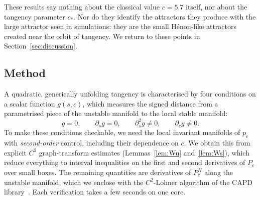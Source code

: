\documentclass[11pt]{amsart}
\theoremstyle{definition}
\theoremstyle{remark}
\newcommand{\cs}{c_*}
\begin{document}
These results say nothing about the classical value $c=5.7$ itself, nor about the tangency parameter $\cs$.
Nor do they identify the attractors they
produce with the large attractor seen in simulations: they are the small H\'enon-like attractors created
near the orbit of tangency. We return to these points in Section~\ref{sec:discussion}.

\subsection*{Method}
A quadratic, generically unfolding tangency is characterised by four conditions on a scalar function
$g(s,c)$, which measures the signed distance from a parametrised piece of the unstable manifold to the
local stable manifold:
\[
g=0,\qquad \partial_s g=0,\qquad \partial_s^2 g\neq 0,\qquad \partial_c g\neq 0 .
\]
To make these conditions checkable, we need the local invariant manifolds of $p_c$ with
\emph{second-order} control, including their dependence on $c$. We obtain this from explicit $C^2$
graph-transform estimates (Lemmas~\ref{lem:Wu} and~\ref{lem:Ws}), which reduce everything to interval
inequalities on the first and second derivatives of $P_c$ over small boxes. The remaining quantities
are derivatives of $P_c^N$ along the unstable manifold, which we enclose with the $C^2$-Lohner
algorithm of the CAPD library~\cite{CAPD21,WZ11}. Each verification takes a few seconds on one core.
\end{document}
